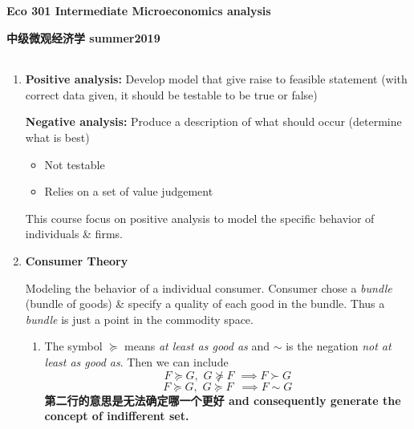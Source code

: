 \documentclass[10pt]{article}
\newenvironment{changemargin}[2]{%
  \begin{list}{}{%
    \setlength{\topsep}{0pt}%
    \setlength{\leftmargin}{#1}%
    \setlength{\rightmargin}{#2}%
    \setlength{\listparindent}{\parindent}%
    \setlength{\itemindent}{\parindent}%
    \setlength{\parsep}{\parskip}%
  }%
  \item[]}{\end{list}}
\begin{document}
\begin{flushright} 
\end{flushright}


\textbf{Eco 301 Intermediate Microeconomics analysis}

\smallskip

\textbf{中级微观经济学 summer2019}

\normalsize

\medskip

\begin{tabular*}{6.5in}{c}
\hline
\end{tabular*}

\bigskip

\begin{changemargin}{-0.125in}{0in}

\begin{enumerate}

    \item \textbf{Positive analysis: }Develop model that give raise to feasible         statement (with correct data given, it should be testable to be true or false)
        
        \smallskip  
  
         \textbf{Negative analysis: }Produce a description of what should occur (determine what is best)
             
             \begin{itemize}
             	\item Not testable
             	\item Relies on a set of value judgement
             \end{itemize}

            This course focus on positive analysis to model the specific behavior of individuals \& firms.
            
    \medskip
            
    \item \textbf{Consumer Theory}
    
       \smallskip
    
        Modeling the behavior of a individual consumer. Consumer chose a \textit{bundle} (bundle of goods) \& specify a quality of each good in the bundle. Thus a \textit{bundle} is just a point in the commodity space.
    
        \medskip
        
        \begin{enumerate}
    
     \item The symbol $\succeq$ means \textit{at least as good as} and $\sim$ is the negation \textit{not at least as good as}. Then we can include 
         \[
         F \succeq G, \,\, G \nsucceq F \,\, \implies F \succ G
         \]
         \[
         F \succeq G, \,\, G \succeq F \,\, \, \implies F \sim G
         \]
         \textbf{第二行的意思是无法确定哪一个更好 and consequently generate the concept of indifferent set.}
         

\end{enumerate}
\end{enumerate}
\end{changemargin}
\end{document}
